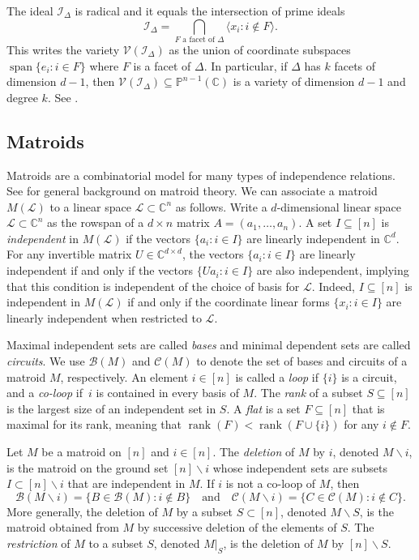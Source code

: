 \documentclass[ALCO,ThmDefs,Unicode,epreuves]{cedram}
\newcommand{\PP}{\mathbb{P}}
\newcommand{\Cbb}{\mathbb{C}}
\newcommand{\V}{\mathcal{V}}
\newcommand{\I}{\mathcal{I}}
\newcommand{\cL}{\mathcal{L}}
\newcommand{\CC}{\mathcal{C}}
\newcommand{\B}{\mathcal{B}}
\DeclareMathOperator{\spanrm}{span}
\DeclareMathOperator{\rank}{rank}
\begin{document}
The ideal $\I_{\Delta}$ is radical 
and it equals the intersection of prime ideals
\[
\I_{\Delta} = \bigcap_{F \text{ a facet of }\Delta} \langle x_i : i\not\in F \rangle.
\]
This writes the variety $\V(\I_{\Delta})$ as the union of coordinate subspaces $\spanrm \{e_i : i\in F\}$ 
where $F$ is a facet of $\Delta$. In particular, if $\Delta$ has $k$ facets of dimension $d-1$, then 
$\V(\I_{\Delta})\subseteq \PP^{n-1}(\Cbb)$ is a variety of dimension $d-1$ and degree $k$. See \cite[Chapter~II]{StanleyCCABook}. 


\subsection{Matroids}
Matroids are a combinatorial model for many types of independence relations. See \cite{Oxley} for 
general background on matroid theory. We can associate a matroid $M(\cL)$ to a linear space $\cL\subset \Cbb^n$ as follows.
Write a $d$-dimensional linear space $\cL\subset \Cbb^n$ as the rowspan of a $d\times n$ matrix $A = (a_1, \ldots , a_n)$. 
A set $I \subseteq [n]$ is \emph{independent} in $M(\cL)$ 
if the vectors $\{a_i : i\in I\}$ are linearly independent in $\Cbb^d$. For any invertible matrix $U\in \Cbb^{d\times d}$, the vectors $\{a_i : i\in I\}$
are linearly independent if and only if the vectors $\{Ua_i : i\in I\}$ are also independent, implying that this condition is independent of the choice of basis for $\cL$. 
Indeed, $I\subseteq [n]$ is independent in $M(\cL)$ if and only if the coordinate linear forms $\{x_i : i\in I\}$ are linearly independent when restricted to $\cL$. 


Maximal independent sets are called \emph{bases} and minimal dependent sets are called \emph{circuits}. We use $\B(M)$ and $\CC (M)$ to denote the 
set of bases and circuits of a matroid $M$, respectively. An element $i\in [n]$ is called a \emph{loop} if $\{i\}$ is a circuit, and a \emph{co-loop} if~$i$ is contained in 
every basis of $M$. 
The \emph{rank} of a subset $S \subseteq [n]$ is the largest size of an independent set in $S$. A \emph{flat} is a set $F\subseteq [n]$ that is maximal for its rank, meaning that 
$\rank(F) <\rank (F \cup \{i\}) $ for any $i\not\in F$. 


Let $M$ be a matroid on $[n]$ and $i \in [n]$. The \emph{deletion} of $M$ by $i$, denoted $M\backslash i $, is the matroid
on the ground set $[n]\backslash i$ whose independent sets are subsets $I\subset [n]\backslash i$ that are independent in $M$. 
If $i$ is not a co-loop of $M$, then 
\[
\B(M\backslash i) = \{ B\in \B (M): i\notin B \} 
\quad \text{and} \quad
\CC (M\backslash i) = \{C\in \CC (M):i\notin C \}. 
\]
More generally, the deletion of $M$ by a subset $S\subset [n]$, denoted $M\backslash S$, is the matroid obtained from $M$ by 
successive deletion of the elements of $S$. The \emph{restriction} of $M$ to a subset $S$, denoted $M|_S$, is 
the deletion of $M$ by $[n]\backslash S$. 
\end{document}
